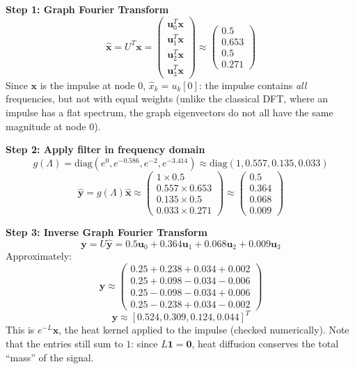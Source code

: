 \begin{notechapter}
\begin{example}
\textbf{Step 1: Graph Fourier Transform}
\[
\hat{\mathbf{x}} = U^T \mathbf{x} =
\begin{pmatrix}
\mathbf{u}_0^T \mathbf{x} \\
\mathbf{u}_1^T \mathbf{x} \\
\mathbf{u}_2^T \mathbf{x} \\
\mathbf{u}_3^T \mathbf{x}
\end{pmatrix}
\approx
\begin{pmatrix}
0.5 \\
0.653 \\
0.5 \\
0.271
\end{pmatrix}
\]
Since $\mathbf{x}$ is the impulse at node 0, $\hat{x}_k = u_k[0]$: the impulse contains \emph{all}
frequencies, but not with equal weights (unlike the classical DFT, where an impulse has a flat spectrum,
the graph eigenvectors do not all have the same magnitude at node 0).

\textbf{Step 2: Apply filter in frequency domain}
\[
g(\Lambda) = \text{diag}(e^0, e^{-0.586}, e^{-2}, e^{-3.414})
\approx \text{diag}(1, 0.557, 0.135, 0.033)
\]
\[
\hat{\mathbf{y}} = g(\Lambda) \hat{\mathbf{x}} \approx
\begin{pmatrix}
1 \times 0.5 \\
0.557 \times 0.653 \\
0.135 \times 0.5 \\
0.033 \times 0.271
\end{pmatrix}
\approx
\begin{pmatrix}
0.5 \\
0.364 \\
0.068 \\
0.009
\end{pmatrix}
\]

\textbf{Step 3: Inverse Graph Fourier Transform}
\[
\mathbf{y} = U \hat{\mathbf{y}} = 0.5\mathbf{u}_0 + 0.364\mathbf{u}_1 +
0.068\mathbf{u}_2 + 0.009\mathbf{u}_3
\]
Approximately:
\[
\mathbf{y} \approx
\begin{pmatrix}
    0.25+0.238+0.034+0.002\\
    0.25+0.098-0.034-0.006\\
    0.25-0.098-0.034+0.006\\
    0.25-0.238+0.034-0.002
\end{pmatrix}
\]
\[
\mathbf{y} \approx [0.524, 0.309, 0.124, 0.044]^T
\]
This is $e^{-L}\mathbf{x}$, the heat kernel applied to the impulse (checked numerically). Note that the
entries still sum to $1$: since $L\mathbf{1} = \mathbf{0}$, heat diffusion conserves the total ``mass'' of the
signal.


\end{example}
\end{notechapter}
